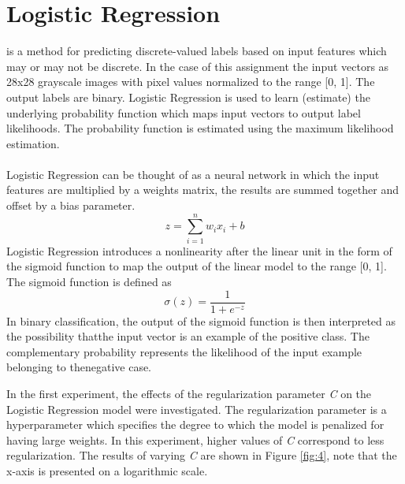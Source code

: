\documentclass[12pt, letterpaper]{article}
\begin{document}
\section{Logistic Regression} is a method for predicting discrete-valued labels
based on input features which may or may not be discrete. In the case of this
assignment the input vectors as 28x28 grayscale images with pixel values normalized 
to the range [0, 1]. The output labels are binary. Logistic Regression is used
to learn (estimate) the underlying probability function which maps input vectors
to output label likelihoods. The probability function is estimated using the
maximum likelihood estimation.

\paragraph*{}Logistic Regression can be thought of as a neural network in which
the input features are multiplied by a weights matrix, the results are summed
together and offset by a bias parameter.
\begin{equation}
    z = \sum_{i=1}^{n} w_i x_i + b
\end{equation}
Logistic Regression introduces a nonlinearity after the linear unit in the
form of the sigmoid function to map the output of the linear model to the range
[0, 1]. The sigmoid function is defined as
\begin{equation}
    \sigma(z) = \frac{1}{1 + e^{-z}}
\end{equation}
In binary classification, the output of the sigmoid function is then interpreted
as the possibility thatthe input vector is an example of the positive class. The
complementary probability represents the likelihood of the input example
belonging to thenegative case.

In the first experiment, the effects of the regularization parameter \textit{C}
on the Logistic Regression model were investigated. The regularization parameter
is a hyperparameter which specifies the degree to which the model is penalized
for having large weights. In this experiment, higher values of \textit{C} correspond
to less regularization. The results of varying \textit{C} are shown in Figure
\ref{fig:4}, note that the x-axis is presented on a logarithmic scale.
\end{document}
